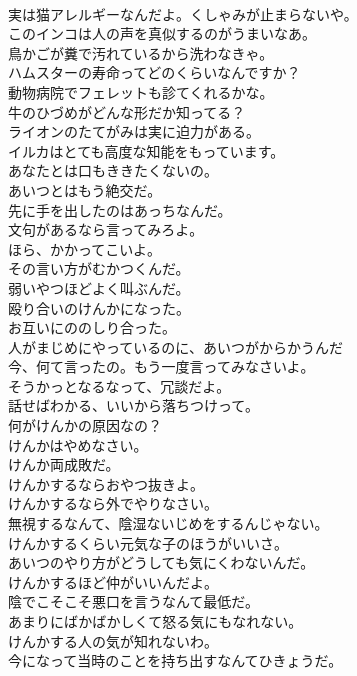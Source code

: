 \documentclass[8pt]{extreport}
\begin{document}
\begin{CJK}{UTF8}{min}
\\	実は猫アレルギーなんだよ。くしゃみが止まらないや。	
\\	このインコは人の声を真似するのがうまいなあ。	
\\	鳥かごが糞で汚れているから洗わなきゃ。	
\\	ハムスターの寿命ってどのくらいなんですか？	
\\	動物病院でフェレットも診てくれるかな。	
\\	牛のひづめがどんな形だか知ってる？	
\\	ライオンのたてがみは実に迫力がある。	
\\	イルカはとても高度な知能をもっています。	
\\	あなたとは口もききたくないの。	
\\	あいつとはもう絶交だ。	
\\	先に手を出したのはあっちなんだ。	
\\	文句があるなら言ってみろよ。	
\\	ほら、かかってこいよ。	
\\	その言い方がむかつくんだ。	
\\	弱いやつほどよく叫ぶんだ。	
\\	殴り合いのけんかになった。	
\\	お互いにののしり合った。	
\\	人がまじめにやっているのに、あいつがからかうんだ	
\\	今、何て言ったの。もう一度言ってみなさいよ。	
\\	そうかっとなるなって、冗談だよ。	
\\	話せばわかる、いいから落ちつけって。	
\\	何がけんかの原因なの？	
\\	けんかはやめなさい。	
\\	けんか両成敗だ。	
\\	けんかするならおやつ抜きよ。	
\\	けんかするなら外でやりなさい。	
\\	無視するなんて、陰湿ないじめをするんじゃない。	
\\	けんかするくらい元気な子のほうがいいさ。	
\\	あいつのやり方がどうしても気にくわないんだ。	
\\	けんかするほど仲がいいんだよ。	
\\	陰でこそこそ悪口を言うなんて最低だ。	
\\	あまりにばかばかしくて怒る気にもなれない。	
\\	けんかする人の気が知れないわ。	
\\	今になって当時のことを持ち出すなんてひきょうだ。	

\end{CJK}
\end{document}
